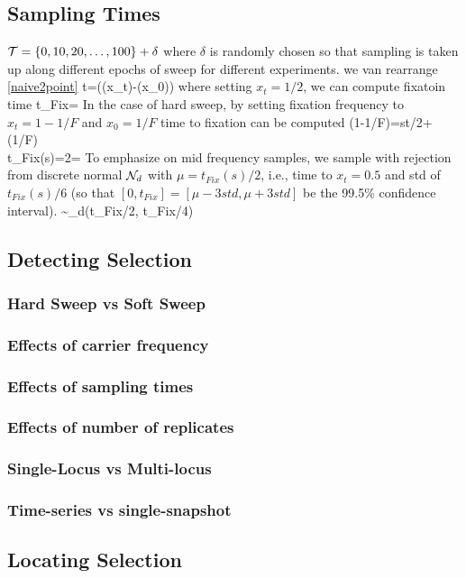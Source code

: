 \documentclass[11pt]{article}
\begin{document}
\subsection{Sampling Times}
${\cal T}=\{0,10,20,\ldots ,100\} + \delta$ where $\delta$ is randomly chosen so 
that sampling is taken up along different epochs of sweep for different 
experiments.
we van rearrange \eqref{naive2point}
\beq
t=(\nu(x_t)-\nu(x_0))
\eeq
where setting $x_t=1/2$, we can compute fixatoin time 
\beq
t_{Fix}=
\eeq
In the case of hard sweep, by setting fixation frequency to $x_t=1-1/F$ and 
$x_0=1/F$ time to fixation can be computed
\beq
\eta(1-1/F)=st/2+\eta(1/F)\\
t_{Fix}(s)=2=
\eeq
To emphasize on mid frequency samples, we sample with rejection from 
discrete normal ${\cal N}_d$ with $\mu=t_{Fix}(s)/2$, i.e., time to $x_t=0.5$ and 
std of $t_{Fix}(s)/6$ (so that $[0,t_{Fix}]=[\mu-3std, \mu+3std]$ be the 
99.5\% confidence interval).
\beq
\delta \sim \Nc_d(t_{Fix}/2, t_{Fix}/4)
\eeq


\subsection{Detecting Selection}
\subsubsection{Hard Sweep vs Soft Sweep}
\subsubsection{Effects of carrier frequency}
\subsubsection{Effects of sampling times}
\subsubsection{Effects of number of replicates}
\subsubsection{Single-Locus vs Multi-locus}
\subsubsection{Time-series vs single-snapshot}

\subsection{Locating Selection}
\end{document}
